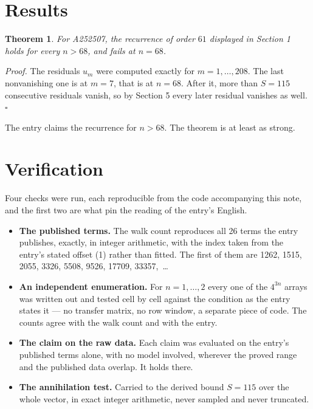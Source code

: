\documentclass[11pt]{article}
\newtheorem{theorem}{Theorem}
\theoremstyle{definition}
\begin{document}
\section{Results}

\begin{theorem} For A252507, the recurrence of order $61$ displayed in Section 1 holds for every $n > 68$, and fails at $n = 68$.\end{theorem}

{\itshape Proof.} The residuals $u_m$ were computed exactly for $m = 1,\dots,208$. The last nonvanishing one is at $m = 7$, that is at $n = 68$. After it, more than $S = 115$ consecutive residuals vanish, so by Section 5 every later residual vanishes as well. $\square$

The entry claims the recurrence for $n > 68$. The theorem is at least as strong.

\section{Verification}

Four checks were run, each reproducible from the code accompanying this note, and the first two are what pin the reading of the entry's English.

\begin{itemize}

\item {\bfseries The published terms.} The walk count reproduces all 26 terms the entry publishes, exactly, in integer arithmetic, with the index taken from the entry's stated offset (1) rather than fitted. The first of them are 1262, 1515, 2055, 3326, 5508, 9526, 17709, 33357,~\dots

\item {\bfseries An independent enumeration.} For $n = 1,\dots,2$ every one of the $4^{3n}$ arrays was written out and tested cell by cell against the condition as the entry states it --- no transfer matrix, no row window, a separate piece of code. The counts agree with the walk count and with the entry.

\item {\bfseries The claim on the raw data.} Each claim was evaluated on the entry's published terms alone, with no model involved, wherever the proved range and the published data overlap. It holds there.

\item {\bfseries The annihilation test.} Carried to the derived bound $S = 115$ over the whole vector, in exact integer arithmetic, never sampled and never truncated.

\end{itemize}
\end{document}
